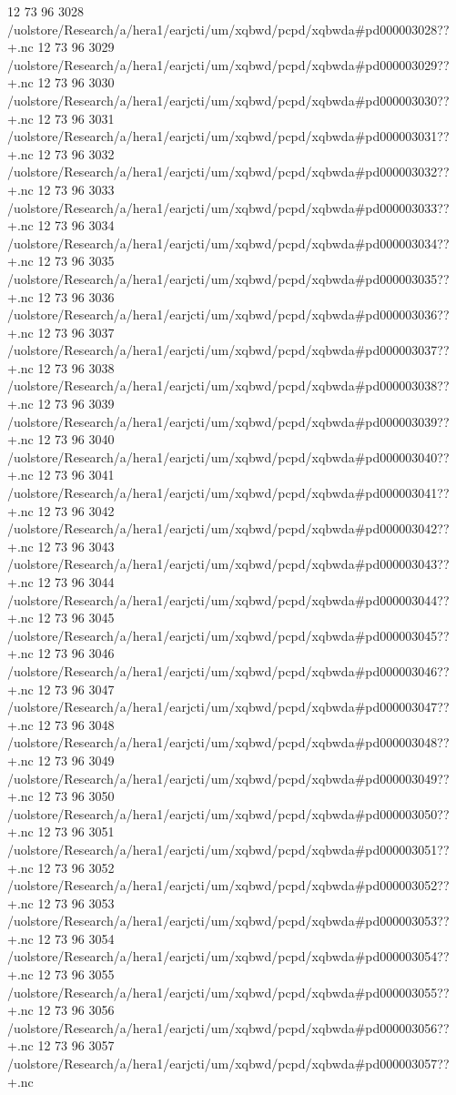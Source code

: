 12 73 96
3028
/uolstore/Research/a/hera1/earjcti/um/xqbwd/pcpd/xqbwda#pd000003028??+.nc
12 73 96
3029
/uolstore/Research/a/hera1/earjcti/um/xqbwd/pcpd/xqbwda#pd000003029??+.nc
12 73 96
3030
/uolstore/Research/a/hera1/earjcti/um/xqbwd/pcpd/xqbwda#pd000003030??+.nc
12 73 96
3031
/uolstore/Research/a/hera1/earjcti/um/xqbwd/pcpd/xqbwda#pd000003031??+.nc
12 73 96
3032
/uolstore/Research/a/hera1/earjcti/um/xqbwd/pcpd/xqbwda#pd000003032??+.nc
12 73 96
3033
/uolstore/Research/a/hera1/earjcti/um/xqbwd/pcpd/xqbwda#pd000003033??+.nc
12 73 96
3034
/uolstore/Research/a/hera1/earjcti/um/xqbwd/pcpd/xqbwda#pd000003034??+.nc
12 73 96
3035
/uolstore/Research/a/hera1/earjcti/um/xqbwd/pcpd/xqbwda#pd000003035??+.nc
12 73 96
3036
/uolstore/Research/a/hera1/earjcti/um/xqbwd/pcpd/xqbwda#pd000003036??+.nc
12 73 96
3037
/uolstore/Research/a/hera1/earjcti/um/xqbwd/pcpd/xqbwda#pd000003037??+.nc
12 73 96
3038
/uolstore/Research/a/hera1/earjcti/um/xqbwd/pcpd/xqbwda#pd000003038??+.nc
12 73 96
3039
/uolstore/Research/a/hera1/earjcti/um/xqbwd/pcpd/xqbwda#pd000003039??+.nc
12 73 96
3040
/uolstore/Research/a/hera1/earjcti/um/xqbwd/pcpd/xqbwda#pd000003040??+.nc
12 73 96
3041
/uolstore/Research/a/hera1/earjcti/um/xqbwd/pcpd/xqbwda#pd000003041??+.nc
12 73 96
3042
/uolstore/Research/a/hera1/earjcti/um/xqbwd/pcpd/xqbwda#pd000003042??+.nc
12 73 96
3043
/uolstore/Research/a/hera1/earjcti/um/xqbwd/pcpd/xqbwda#pd000003043??+.nc
12 73 96
3044
/uolstore/Research/a/hera1/earjcti/um/xqbwd/pcpd/xqbwda#pd000003044??+.nc
12 73 96
3045
/uolstore/Research/a/hera1/earjcti/um/xqbwd/pcpd/xqbwda#pd000003045??+.nc
12 73 96
3046
/uolstore/Research/a/hera1/earjcti/um/xqbwd/pcpd/xqbwda#pd000003046??+.nc
12 73 96
3047
/uolstore/Research/a/hera1/earjcti/um/xqbwd/pcpd/xqbwda#pd000003047??+.nc
12 73 96
3048
/uolstore/Research/a/hera1/earjcti/um/xqbwd/pcpd/xqbwda#pd000003048??+.nc
12 73 96
3049
/uolstore/Research/a/hera1/earjcti/um/xqbwd/pcpd/xqbwda#pd000003049??+.nc
12 73 96
3050
/uolstore/Research/a/hera1/earjcti/um/xqbwd/pcpd/xqbwda#pd000003050??+.nc
12 73 96
3051
/uolstore/Research/a/hera1/earjcti/um/xqbwd/pcpd/xqbwda#pd000003051??+.nc
12 73 96
3052
/uolstore/Research/a/hera1/earjcti/um/xqbwd/pcpd/xqbwda#pd000003052??+.nc
12 73 96
3053
/uolstore/Research/a/hera1/earjcti/um/xqbwd/pcpd/xqbwda#pd000003053??+.nc
12 73 96
3054
/uolstore/Research/a/hera1/earjcti/um/xqbwd/pcpd/xqbwda#pd000003054??+.nc
12 73 96
3055
/uolstore/Research/a/hera1/earjcti/um/xqbwd/pcpd/xqbwda#pd000003055??+.nc
12 73 96
3056
/uolstore/Research/a/hera1/earjcti/um/xqbwd/pcpd/xqbwda#pd000003056??+.nc
12 73 96
3057
/uolstore/Research/a/hera1/earjcti/um/xqbwd/pcpd/xqbwda#pd000003057??+.nc
